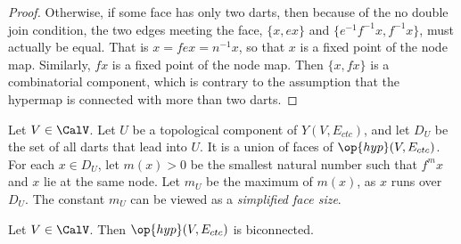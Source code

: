\begin{proof}
  Otherwise, if some face has only two darts, then because of the no
  double join condition, the two edges meeting the face, $\{x, e x\}$
  and $\{ e^{-1} f^{-1} x, f^{-1} x\}$, must actually be equal.  That
  is $ x = f e x = n^{-1} x$, so that $x$ is a fixed point of the node
  map.  Similarly, $f x$ is a fixed point of the node map.  Then $\{x,
  f x\}$ is a combinatorial component, which is contrary to the
  assumption that the hypermap is connected with more than two darts.
\end{proof}


\begin{definition}[$D_U$,~$m_U$]
  Let $V\in \CalV$.  Let $U$ be a topological component of
  $Y(V,E_{ctc})$, and let $D_U$ be the set of all darts that lead into
  $U$.  It is a union of faces of $\op{hyp}(V,E_{ctc})$.  For each
  $x\in D_U$, let $m(x) >0$ be the smallest natural number such that
  $f^{m} x$ and $x$ lie at the same node.  Let $m_U$ be the maximum of
  $m(x)$, as $x$ runs over $D_U$.  The constant $m_U$ can be viewed as
  a {\it simplified face size}.  %
\end{definition}

\begin{lemma}[biconnected]\label{lemma:biconnected}
  Let $V\in \CalV$.  Then $\op{hyp}(V,E_{ctc})$ is biconnected.
\end{lemma}


